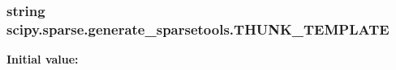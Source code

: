 \subsubsection[{T\+H\+U\+N\+K\+\_\+\+T\+E\+M\+P\+L\+A\+T\+E}]{\setlength{\rightskip}{0pt plus 5cm}string scipy.\+sparse.\+generate\+\_\+sparsetools.\+T\+H\+U\+N\+K\+\_\+\+T\+E\+M\+P\+L\+A\+T\+E}\label{namespacescipy_1_1sparse_1_1generate__sparsetools_a3e9ff6cfee1ff57715fbcc99081da666}
{\bfseries Initial value\+:}
